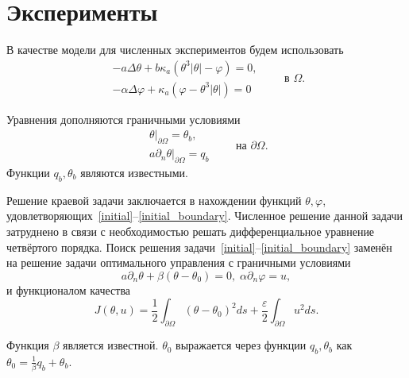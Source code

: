 \documentclass[10pt]{article}
\begin{document}
    \section{Эксперименты}

    В качестве модели для численных экспериментов будем использовать
    \begin{equation}
        \label{initial}
        \begin{aligned}
            - a \Delta \theta + b \kappa_a(\theta ^ 3 | \theta | - \varphi) = 0,  \\
            - \alpha \Delta \varphi + \kappa_a (\varphi - \theta ^3 | \theta |) = 0
        \end{aligned}
        \qquad \text{в } \Omega.
    \end{equation}

    Уравнения дополняются граничными условиями
    \begin{equation}
        \label{initial_boundary}
        \begin{aligned}
            \theta|_{\partial \Omega} = \theta_b, \\
            a \partial_n \theta |_{\partial \Omega} = q_b
        \end{aligned}
        \qquad \text{на } \partial \Omega.
    \end{equation}
    Функции $q_b, \theta_b$ являются известными.

    Решение краевой задачи заключается в нахождении функций $\theta, \varphi$,
    удовлетворяющих~\eqref{initial}--\eqref{initial_boundary}.
    Численное решение данной задачи затруднено в связи с необходимостью решать
    дифференциальное уравнение четвёртого порядка.
    Поиск решения задачи~\eqref{initial}--\eqref{initial_boundary}
    заменён на решение задачи оптимального управления с граничными условиями
    \begin{equation}
        \label{initial_boundary_2}
        a \partial_n \theta + \beta (\theta -\theta_0) = 0, \; \alpha \partial_n \varphi = u,
    \end{equation}
    и функционалом качества
    \begin{equation}
        \label{quality}
        J(\theta, u) = \frac{1}{2} \int_{\partial \Omega}
        (\theta - \theta_0)^2 ds + \frac{\varepsilon}{2} \int_{\partial \Omega} u^2 ds.
    \end{equation}

    Функция $\beta$ является известной. $\theta_0$ выражается
    через функции $q_b, \theta_b$ как $\theta_0 = \frac{1}{\beta}q_b + \theta_b$.
\end{document}
